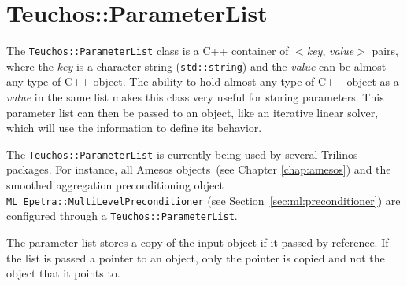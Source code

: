 \clearpage

\section{Teuchos::ParameterList}
\label{sec:teuchos:ParameterList}

The {\tt Teuchos::ParameterList} class is a C++ container of $<${\it key}, {\it value}$>$ pairs, 
where the {\it key} is a character string ({\tt std::string}) and the {\it value} can be almost 
any type of C++ object.  The ability to hold almost any type of C++ object as a {\it value} 
in the same list makes this class very useful for storing parameters.  This parameter list can then
be passed to an object, like an iterative linear solver, which will use the information to define 
its behavior. 

The \verb!Teuchos::ParameterList! is currently being used by several Trilinos
packages.  For instance, all Amesos objects~(see Chapter
\ref{chap:amesos}) and the smoothed aggregation preconditioning object
\verb!ML_Epetra::MultiLevelPreconditioner! (see Section~\ref{sec:ml:preconditioner}) 
are configured through a \verb!Teuchos::ParameterList!.

\begin{remark}
The parameter list stores a copy of the input object if it passed by reference.  
If the list is passed a pointer to an object, only the pointer is copied and
not the object that it points to. 
\end{remark}

